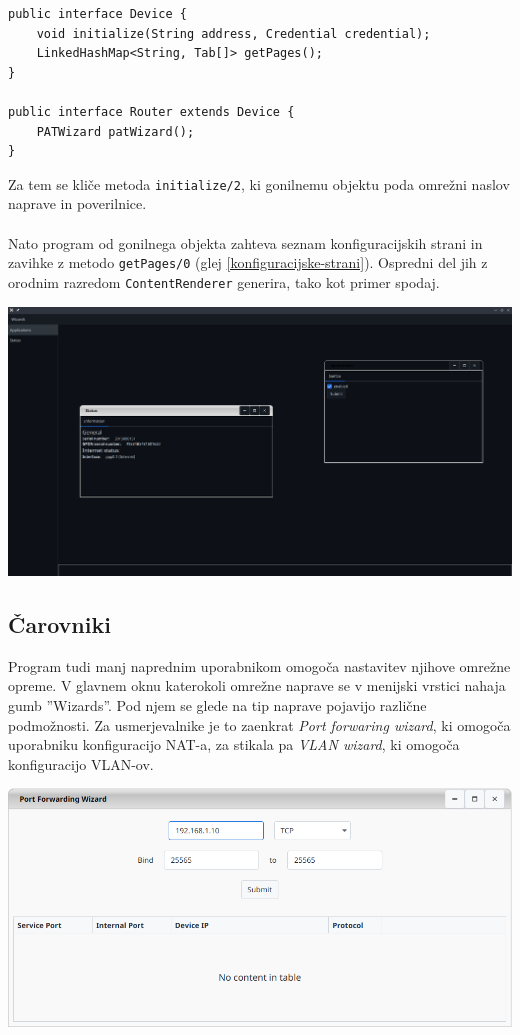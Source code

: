 \documentclass[12pt]{article}
\begin{document}
\begin{lstlisting}[style=JavaStyle]
public interface Device {
	void initialize(String address, Credential credential);
	LinkedHashMap<String, Tab[]> getPages();
}

public interface Router extends Device {
	PATWizard patWizard();
}
\end{lstlisting}
Za tem se kliče metoda \texttt{initialize/2}, ki gonilnemu objektu poda
omrežni naslov naprave in poverilnice.
\\\\
Nato program od gonilnega objekta zahteva seznam konfiguracijskih strani
in zavihke z metodo \texttt{getPages/0} (glej \ref{konfiguracijske-strani}).
Ospredni del jih z orodnim razredom \texttt{ContentRenderer} generira, tako
kot primer spodaj.

\begin{center}
	\includegraphics[scale=0.28]{slike/config-window.png}
\end{center}
\newpage

\subsection{Čarovniki}
Program tudi manj naprednim uporabnikom omogoča nastavitev njihove omrežne
opreme. V glavnem oknu katerokoli omrežne naprave se v menijski vrstici
nahaja gumb ''Wizards''. Pod njem se glede na tip naprave pojavijo različne
podmožnosti. Za usmerjevalnike je to zaenkrat \textit{Port forwaring wizard},
ki omogoča uporabniku konfiguracijo NAT-a, za stikala pa
\textit{VLAN wizard}, ki omogoča konfiguracijo VLAN-ov.

\begin{center}
	\includegraphics[scale=0.56]{slike/pat-wizard.png}
\end{center}
\newpage
\end{document}
